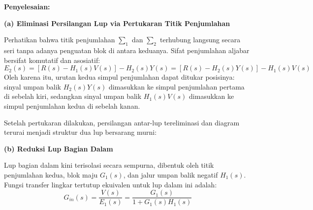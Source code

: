 \documentclass[11pt,a4paper]{article}
\begin{document}
\textbf{Penyelesaian:}

\textbf{(a) Eliminasi Persilangan Lup via Pertukaran Titik Penjumlahan}

Perhatikan bahwa titik penjumlahan $\sum_1$ dan $\sum_2$ terhubung langsung secara seri tanpa adanya penguatan blok di antara keduanya. Sifat penjumlahan aljabar bersifat komutatif dan asosiatif:
$$E_2(s) = [R(s) - H_1(s)V(s)] - H_2(s)Y(s) = [R(s) - H_2(s)Y(s)] - H_1(s)V(s)$$
Oleh karena itu, urutan kedua simpul penjumlahan dapat ditukar posisinya: sinyal umpan balik $H_2(s)Y(s)$ dimasukkan ke simpul penjumlahan pertama di sebelah kiri, sedangkan sinyal umpan balik $H_1(s)V(s)$ dimasukkan ke simpul penjumlahan kedua di sebelah kanan.

Setelah pertukaran dilakukan, persilangan antar-lup tereliminasi dan diagram terurai menjadi struktur dua lup bersarang murni:

\begin{center}
\end{center}

\textbf{(b) Reduksi Lup Bagian Dalam}

Lup bagian dalam kini terisolasi secara sempurna, dibentuk oleh titik penjumlahan kedua, blok maju $G_1(s)$, dan jalur umpan balik negatif $H_1(s)$.
Fungsi transfer lingkar tertutup ekuivalen untuk lup dalam ini adalah:
$$G_{in}(s) = \frac{V(s)}{E_1(s)} = \frac{G_1(s)}{1 + G_1(s) H_1(s)}$$
\end{document}
